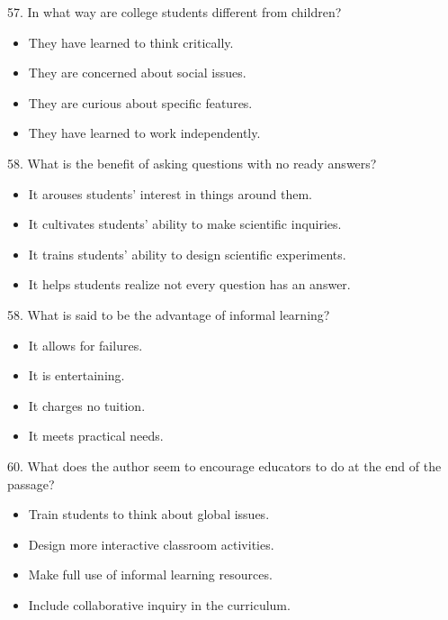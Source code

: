 \documentclass[UTF8,11pt]{ctexart}
\begin{document}
57. In what way are college students different from children?


\begin{itemize}[leftmargin=2em,itemsep=.2em,topsep=.4em]\item[A.] They have learned to think critically.
\item[B.] They are concerned about social issues.
\item[C.] They are curious about specific features.
\item[D.] They have learned to work independently.
\end{itemize}

58. What is the benefit of asking questions with no ready answers?


\begin{itemize}[leftmargin=2em,itemsep=.2em,topsep=.4em]\item[A.] It arouses students’ interest in things around them.
\item[B.] It cultivates students’ ability to make scientific inquiries.
\item[C.] It trains students’ ability to design scientific experiments.
\item[D.] It helps students realize not every question has an answer.
\end{itemize}

58. What is said to be the advantage of informal learning?


\begin{itemize}[leftmargin=2em,itemsep=.2em,topsep=.4em]\item[A.] It allows for failures.
\item[B.] It is entertaining.
\item[C.] It charges no tuition.
\item[D.] It meets practical needs.
\end{itemize}

60. What does the author seem to encourage educators to do at the end of the passage?


\begin{itemize}[leftmargin=2em,itemsep=.2em,topsep=.4em]\item[A.] Train students to think about global issues.
\item[B.] Design more interactive classroom activities.
\item[C.] Make full use of informal learning resources.
\item[D.] Include collaborative inquiry in the curriculum.
\end{itemize}
\end{document}
